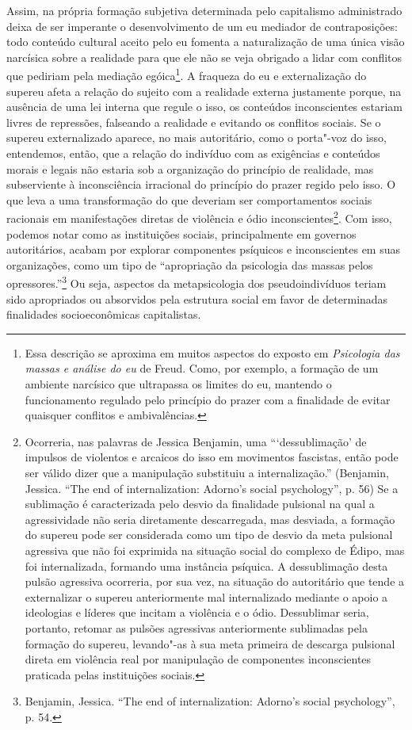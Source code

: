 Assim, na própria formação subjetiva determinada pelo capitalismo
administrado deixa de ser imperante o desenvolvimento de um eu mediador
de contraposições: todo conteúdo cultural aceito pelo eu fomenta a
naturalização de uma única visão narcísica sobre a realidade para que
ele não se veja obrigado a lidar com conflitos que pediriam pela
mediação egóica\footnote{Essa descrição se aproxima em muitos aspectos
  do exposto em \emph{Psicologia das massas e análise do eu} de Freud.
  Como, por exemplo, a formação de um ambiente narcísico que ultrapassa
  os limites do eu, mantendo o funcionamento regulado pelo princípio do
  prazer com a finalidade de evitar quaisquer conflitos e ambivalências.}.
A fraqueza do eu e externalização do supereu afeta a relação do sujeito
com a realidade externa justamente porque, na ausência de uma lei
interna que regule o isso, os conteúdos inconscientes estariam livres de
repressões, falseando a realidade e evitando os conflitos sociais. Se o
supereu externalizado aparece, no mais autoritário, como o porta"-voz do
isso, entendemos, então, que a relação do indivíduo com as exigências e
conteúdos morais e legais não estaria sob a organização do princípio de
realidade, mas subserviente à inconsciência irracional do princípio do
prazer regido pelo isso. O que leva a uma transformação do que deveriam
ser comportamentos sociais racionais em manifestações diretas de
violência e ódio inconscientes\footnote{Ocorreria, nas palavras de
  Jessica Benjamin, uma ```dessublimação' de impulsos de violentos e
  arcaicos do isso em movimentos fascistas, então pode ser válido dizer
  que a manipulação substituiu a internalização.'' (Benjamin, Jessica.
  ``The end of internalization: Adorno's social psychology'', p. 56) Se
  a sublimação é caracterizada pelo desvio da finalidade pulsional na
  qual a agressividade não seria diretamente descarregada, mas desviada,
  a formação do supereu pode ser considerada como um tipo de desvio da
  meta pulsional agressiva que não foi exprimida na situação social do
  complexo de Édipo, mas foi internalizada, formando uma instância
  psíquica. A dessublimação desta pulsão agressiva ocorreria, por sua
  vez, na situação do autoritário que tende a externalizar o supereu
  anteriormente mal internalizado mediante o apoio a ideologias e
  líderes que incitam a violência e o ódio. Dessublimar seria, portanto,
  retomar as pulsões agressivas anteriormente sublimadas pela formação
  do supereu, levando"-as à sua meta primeira de descarga pulsional
  direta em violência real por manipulação de componentes inconscientes
  praticada pelas instituições sociais.}. Com isso, podemos notar como
as instituições sociais, principalmente em governos autoritários, acabam
por explorar componentes psíquicos e inconscientes em suas organizações,
como um tipo de ``apropriação da psicologia das massas pelos
opressores.''\footnote{Benjamin, Jessica. ``The end of internalization:
  Adorno's social psychology'', p. 54.} Ou seja, aspectos da
metapsicologia dos pseudoindivíduos teriam sido apropriados ou
absorvidos pela estrutura social em favor de determinadas finalidades
socioeconômicas capitalistas.

